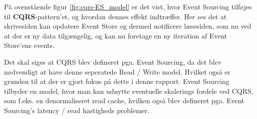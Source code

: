 På ovenstående figur \ref{fig:cqrs-ES_model} er det vist, hvor Event Sourcing tilføjes til \textbf{CQRS}-pattern'et, og hvordan dennes effekt indtræffer. Her ses det at skrivesiden kan opdatere Event Store og dermed notificere læsesiden, som nu ved at der er ny data tilgængelig, og kan nu foretage en ny iteration af Event Store'ens events. \newline 

Det skal siges at CQRS blev defineret pga. Event Sourcing, da det blev nødvendigt at have denne seperatede Read / Write model. Hvilket også er grunden til at der er gjort fokus på dette i denne rapport. Event Sourcing tilbyder en model, hvor man kan udnytte eventuelle skalerings fordele ved CQRS, som f.eks. en denormaliseret read cache, hvilken også blev defineret pga. Event Sourcing's latency / read hastigheds problemer.